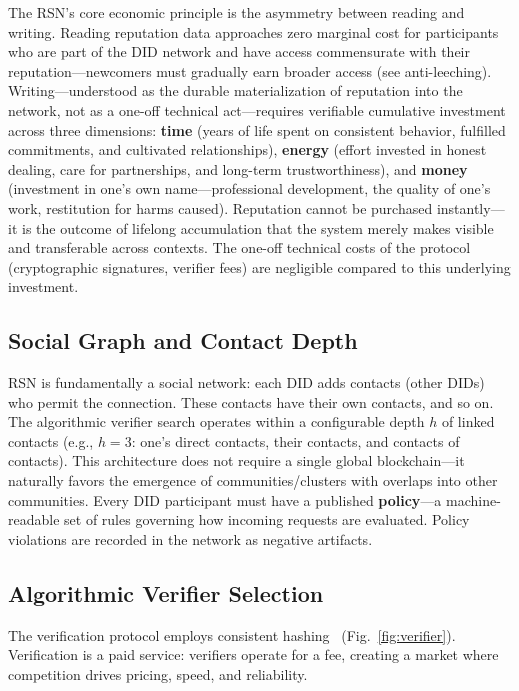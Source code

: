 \documentclass[11pt,a4paper,twocolumn]{article}
\begin{document}
The RSN's core economic principle is the asymmetry between reading and writing. Reading reputation data approaches zero marginal cost for participants who are part of the DID network and have access commensurate with their reputation---newcomers must gradually earn broader access (see anti-leeching). Writing---understood as the durable materialization of reputation into the network, not as a one-off technical act---requires verifiable cumulative investment across three dimensions: \textbf{time} (years of life spent on consistent behavior, fulfilled commitments, and cultivated relationships), \textbf{energy} (effort invested in honest dealing, care for partnerships, and long-term trustworthiness), and \textbf{money} (investment in one's own name---professional development, the quality of one's work, restitution for harms caused). Reputation cannot be purchased instantly---it is the outcome of lifelong accumulation that the system merely makes visible and transferable across contexts. The one-off technical costs of the protocol (cryptographic signatures, verifier fees) are negligible compared to this underlying investment.

\subsection{Social Graph and Contact Depth}

RSN is fundamentally a social network: each DID adds contacts (other DIDs) who permit the connection. These contacts have their own contacts, and so on. The algorithmic verifier search operates within a configurable depth $h$ of linked contacts (e.g., $h=3$: one's direct contacts, their contacts, and contacts of contacts). This architecture does not require a single global blockchain---it naturally favors the emergence of communities/clusters with overlaps into other communities. Every DID participant must have a published \textbf{policy}---a machine-readable set of rules governing how incoming requests are evaluated. Policy violations are recorded in the network as negative artifacts.

\subsection{Algorithmic Verifier Selection}

The verification protocol employs consistent hashing~\cite{karger1997} (Fig.~\ref{fig:verifier}). Verification is a paid service: verifiers operate for a fee, creating a market where competition drives pricing, speed, and reliability.
\end{document}
